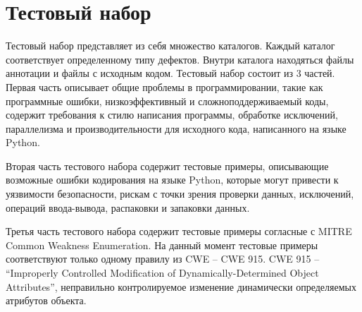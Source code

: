\section{Тестовый набор}\label{sec:ch3/sect3}
Тестовый набор представляет из себя множество каталогов. Каждый каталог соответствует определенному типу дефектов. 
Внутри каталога находяться файлы аннотации и файлы с исходным кодом. Тестовый набор состоит из 3 частей. 
Первая часть описывает общие проблемы в
программировании, такие как программные ошибки, низкоэффективный и сложноподдерживаемый коды, содержит требования к стилю написания
программы, обработке исключений, параллелизма и производительности для исходного кода, написанного на языке Python.

Вторая часть тестового набора содержит тестовые примеры, описывающие 
возможные ошибки кодирования на языке Python, которые
могут привести к уязвимости безопасности, рискам с точки зрения проверки данных, исключений, операций ввода-вывода, распаковки и запаковки данных. 

Третья часть тестового набора содержит тестовые примеры согласные с
MITRE Common Weakness Enumeration. На данный момент тестовые примеры соответствуют только одному правилу из CWE -- CWE 915. 
CWE 915 -- ``Improperly
Controlled Modification of Dynamically-Determined Object Attributes'', неправильно
контролируемое изменение динамически определяемых атрибутов объекта.

\clearpage
